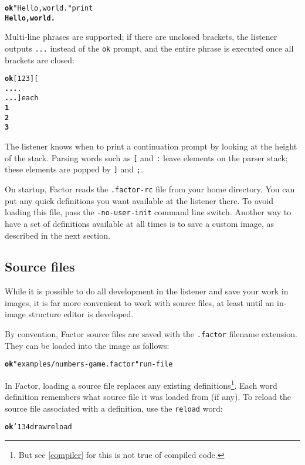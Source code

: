 \documentclass{book}
\newcommand{\bs}{\char'134}
\begin{document}
\begin{alltt}
\textbf{ok} "Hello, world." print
\textbf{Hello, world.}
\end{alltt}


Multi-line phrases are supported; if there are unclosed brackets, the listener outputs \texttt{...} instead of the \texttt{ok} prompt, and the entire phrase is executed once all brackets are closed:

\begin{alltt}
\textbf{ok} [ 1 2 3 ] [
\textbf{...} .
\textbf{...} ] each
\textbf{1
2
3}
\end{alltt}

The listener knows when to print a continuation prompt by looking at the height of the
stack. Parsing words such as \texttt{[} and \texttt{:} leave elements on the parser
stack; these elements are popped by \texttt{]} and \texttt{;}.

On startup, Factor reads the \texttt{.factor-rc} file from your home directory. You can put
any quick definitions you want available at the listener there. To avoid loading this
file, pass the \texttt{-no-user-init} command line switch. Another way to have a set of definitions available at all times is to save a custom image, as described in the next section.

\subsection{Source files}

While it is possible to do all development in the listener and save your work in images, it is far more convenient to work with source files, at least until an in-image structure editor is developed.

By convention, Factor source files are saved with the \texttt{.factor} filename extension. They can be loaded into the image as follows:

\begin{alltt}
\textbf{ok} "examples/numbers-game.factor" run-file
\end{alltt}

In Factor, loading a source file replaces any existing definitions\footnote{But see \ref{compiler} for this is not true of compiled code.}. Each word definition remembers what source file it was loaded from (if any). To reload the source file associated with a definition, use the \texttt{reload} word:

\begin{alltt}
\textbf{ok} \bs draw reload
\end{alltt}
\end{document}
